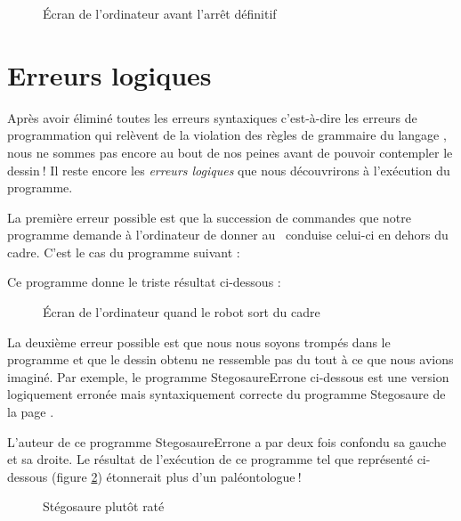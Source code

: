 \begin{figure}[p] %
 \caption{Écran de l'or\-di\-na\-teur avant l'arrêt définitif}
 \label{fig:ecran-arret}
\end{figure}

\clearpage
\section{Erreurs logiques} 

Après avoir éliminé toutes les erreurs syntaxiques c'est-à-dire 
les erreurs de programmation qui relèvent de la violation des règles de grammaire 
du langage \pascal, nous ne sommes pas encore au bout de nos peines avant de pouvoir
contempler le \hbox{dessin$\:$!} Il reste encore les
{\em erreurs logiques}
que nous découvrirons à l'exécution du programme.

La première erreur possible est que la succession de commandes que notre
programme demande à l'or\-di\-na\-teur de donner au \robot\ conduise celui-ci
en dehors du cadre. C'est le cas du programme suivant :

\noindent Ce programme donne le triste résultat 
ci-dessous :
\begin{figure}[htbp]
 \caption{Écran de l'or\-di\-na\-teur quand le robot sort du cadre}
\end{figure}

La deuxième erreur possible est que nous nous soyons trompés dans
le programme et que le dessin obtenu ne ressemble pas du tout à ce
que nous avions imaginé. Par exemple, le programme {\idt StegosaureErrone}
ci-dessous est une version logiquement erronée mais syntaxiquement 
correcte du programme {\idt Stegosaure} de la page \pageref{prog:Stegosaure}. 

L'auteur de ce programme {\idt StegosaureErrone} a par deux fois confondu sa gauche 
et sa droite. Le 
résultat de l'exécution de ce programme tel
que représenté
ci-dessous
(figure \ref{fig:StegosaureErrone}) %
éton\-ne\-rait plus d'un pa\-lé\-on\-to\-lo\-gue$\:$!
\begin{figure}[htbp]
 \caption{Stégosaure plutôt raté}
 \label{fig:StegosaureErrone}
\end{figure}

